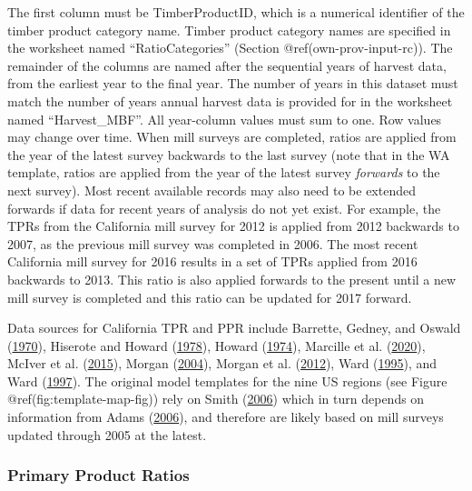 \documentclass[
  openany]{book}
\begin{document}
The first column must be TimberProductID, which is a numerical
identifier of the timber product category name. Timber product category
names are specified in the worksheet named ``RatioCategories'' (Section
@ref(own-prov-input-rc)). The remainder of the columns are named after
the sequential years of harvest data, from the earliest year to the
final year. The number of years in this dataset must match the number of
years annual harvest data is provided for in the worksheet named
``Harvest\_MBF''. All year-column values must sum to one. Row values may
change over time. When mill surveys are completed, ratios are applied
from the year of the latest survey backwards to the last survey (note
that in the WA template, ratios are applied from the year of the latest
survey \emph{forwards} to the next survey). Most recent available
records may also need to be extended forwards if data for recent years
of analysis do not yet exist. For example, the TPRs from the California
mill survey for 2012 is applied from 2012 backwards to 2007, as the
previous mill survey was completed in 2006. The most recent California
mill survey for 2016 results in a set of TPRs applied from 2016
backwards to 2013. This ratio is also applied forwards to the present
until a new mill survey is completed and this ratio can be updated for
2017 forward.

Data sources for California TPR and PPR include Barrette, Gedney, and
Oswald (\protect\hyperlink{ref-barrette1970}{1970}), Hiserote and Howard
(\protect\hyperlink{ref-hiserote1978}{1978}), Howard
(\protect\hyperlink{ref-howard1974}{1974}), Marcille et al.
(\protect\hyperlink{ref-marcille2020}{2020}), McIver et al.
(\protect\hyperlink{ref-mciver2015}{2015}), Morgan
(\protect\hyperlink{ref-morgan2004}{2004}), Morgan et al.
(\protect\hyperlink{ref-morgan2012}{2012}), Ward
(\protect\hyperlink{ref-ward1995}{1995}), and Ward
(\protect\hyperlink{ref-ward1997}{1997}). The original model templates
for the nine US regions (see Figure @ref(fig:template-map-fig)) rely on
Smith (\protect\hyperlink{ref-smith2006}{2006}) which in turn depends on
information from Adams (\protect\hyperlink{ref-adams2006}{2006}), and
therefore are likely based on mill surveys updated through 2005 at the
latest.

\hypertarget{own-prov-input-ppr}{%
\subsubsection{Primary Product Ratios}\label{own-prov-input-ppr}}
\end{document}
